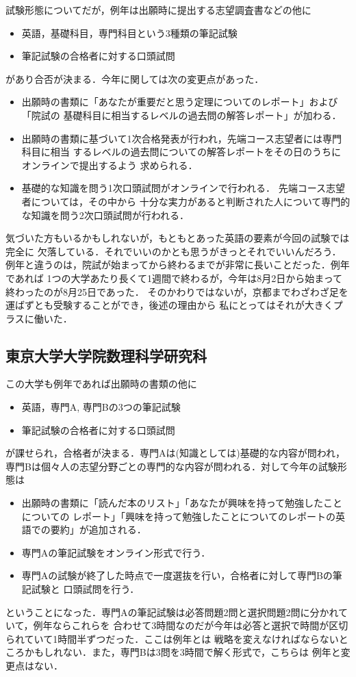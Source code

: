 \documentclass[dvipdfmx,uplatex]{jsarticle}
\begin{document}
試験形態についてだが，例年は出願時に提出する志望調査書などの他に
\begin{itemize}
    \item 英語，基礎科目，専門科目という3種類の筆記試験
    \item 筆記試験の合格者に対する口頭試問
\end{itemize}
があり合否が決まる．今年に関しては次の変更点があった．
\begin{itemize}
    \item 出願時の書類に「あなたが重要だと思う定理についてのレポート」および「院試の
    基礎科目に相当するレベルの過去問の解答レポート」が加わる．
    \item 出願時の書類に基づいて1次合格発表が行われ，先端コース志望者には専門科目に相当
    するレベルの過去問についての解答レポートをその日のうちにオンラインで提出するよう
    求められる．
    \item 基礎的な知識を問う1次口頭試問がオンラインで行われる．
    先端コース志望者については，その中から
    十分な実力があると判断された人について専門的な知識を問う2次口頭試問が行われる．
\end{itemize}
気づいた方もいるかもしれないが，もともとあった英語の要素が今回の試験では完全に
欠落している．それでいいのかとも思うがきっとそれでいいんだろう．
例年と違うのは，院試が始まってから終わるまでが非常に長いことだった．例年であれば
1つの大学あたり長くて1週間で終わるが，今年は8月2日から始まって終わったのが8月25日であった．
そのかわりではないが，京都までわざわざ足を運ばずとも受験することができ，後述の理由から
私にとってはそれが大きくプラスに働いた．

\subsection*{東京大学大学院数理科学研究科}
この大学も例年であれば出願時の書類の他に
\begin{itemize}
    \item 英語，専門A, 専門Bの3つの筆記試験
    \item 筆記試験の合格者に対する口頭試問
\end{itemize}
が課せられ，合格者が決まる．専門Aは(知識としては)基礎的な内容が問われ，
専門Bは個々人の志望分野ごとの専門的な内容が問われる．対して今年の試験形態は
\begin{itemize}
    \item 出願時の書類に「読んだ本のリスト」「あなたが興味を持って勉強したことについての
    レポート」「興味を持って勉強したことについてのレポートの英語での要約」が追加される．
    \item 専門Aの筆記試験をオンライン形式で行う．
    \item 専門Aの試験が終了した時点で一度選抜を行い，合格者に対して専門Bの筆記試験と
    口頭試問を行う．
\end{itemize}
ということになった．専門Aの筆記試験は必答問題2問と選択問題2問に分かれていて，例年ならこれらを
合わせて3時間なのだが今年は必答と選択で時間が区切られていて1時間半ずつだった．ここは例年とは
戦略を変えなければならないところかもしれない．また，専門Bは3問を3時間で解く形式で，こちらは
例年と変更点はない．
\end{document}
